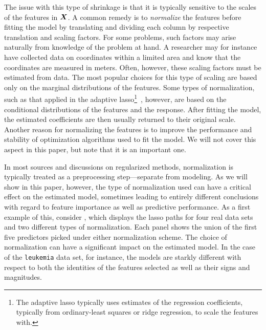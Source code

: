 The issue with this type of shrinkage is that it is typically sensitive to the scales of the features in \(\boldsymbol X\).
A common remedy is to \emph{normalize} the features before fitting the model by translating and dividing each column by respective translation and scaling factors.
For some problems, such factors may arise naturally from knowledge of the problem at hand.
A researcher may for instance have collected data on coordinates within a limited area and know that the coordinates are measured in meters.
Often, however, these scaling factors must be estimated from data.
The most popular choices for this type of scaling are based only on the marginal distributions of the features.
Some types of normalization, such as that applied in the adaptive lasso\footnote{The adaptive lasso typically uses estimates of the regression coefficients, typically from ordinary-least squares or ridge regression, to scale the features with.}~\citep{zou2006}, however, are based on the conditional distributions of the features and the response.
After fitting the model, the estimated coefficients are then usually returned to their original scale.
Another reason for normalizing the features is to improve the performance and stability of optimization algorithms used to fit the model.
We will not cover this aspect in this paper, but note that it is an important one.

In most sources and discussions on regularized methods, normalization is typically treated as a preprocessing step---separate from modeling. As we will show in this paper, however, the type of normalization used can have a critical effect on the estimated model, sometimes leading to entirely different conclusions with regard to feature importance as well as predictive performance. As a first example of this, consider , which displays the lasso paths for four real data sets and two different types of normalization. Each panel shows the union of the first five predictors picked under either normalization scheme. The choice of normalization can have a significant impact on the estimated model. In the case of the \texttt{leukemia} data set, for instance, the models are starkly different with respect to both the identities of the features selected as well as their signs and magnitudes.

